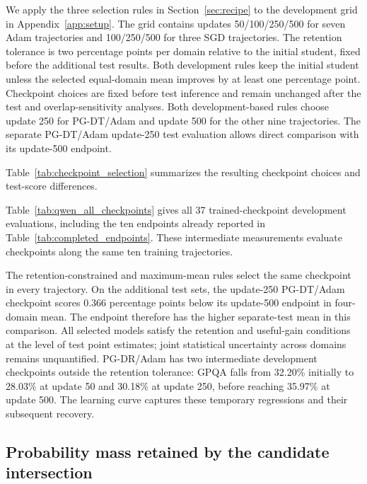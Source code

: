 We apply the three selection rules in Section~\ref{sec:recipe} to the development grid in Appendix~\ref{app:setup}. The grid contains updates 50/100/250/500 for seven Adam trajectories and 100/250/500 for three SGD trajectories. The retention tolerance is two percentage points per domain relative to the initial student, fixed before the additional test results. Both development rules keep the initial student unless the selected equal-domain mean improves by at least one percentage point. Checkpoint choices are fixed before test inference and remain unchanged after the test and overlap-sensitivity analyses. Both development-based rules choose update 250 for PG-DT/Adam and update 500 for the other nine trajectories. The separate PG-DT/Adam update-250 test evaluation allows direct comparison with its update-500 endpoint.

Table~\ref{tab:checkpoint_selection} summarizes the resulting checkpoint choices and test-score differences.



Table~\ref{tab:qwen_all_checkpoints} gives all 37 trained-checkpoint development evaluations, including the ten endpoints already reported in Table~\ref{tab:completed_endpoints}. These intermediate measurements evaluate checkpoints along the same ten training trajectories.


The retention-constrained and maximum-mean rules select the same checkpoint in every trajectory. On the additional test sets, the update-250 PG-DT/Adam checkpoint scores 0.366 percentage points below its update-500 endpoint in four-domain mean. The endpoint therefore has the higher separate-test mean in this comparison. All selected models satisfy the retention and useful-gain conditions at the level of test point estimates; joint statistical uncertainty across domains remains unquantified. PG-DR/Adam has two intermediate development checkpoints outside the retention tolerance: GPQA falls from 32.20\% initially to 28.03\% at update 50 and 30.18\% at update 250, before reaching 35.97\% at update 500. The learning curve captures these temporary regressions and their subsequent recovery.

\subsection{Probability mass retained by the candidate intersection}
\label{app:actual_intersection_coverage}

